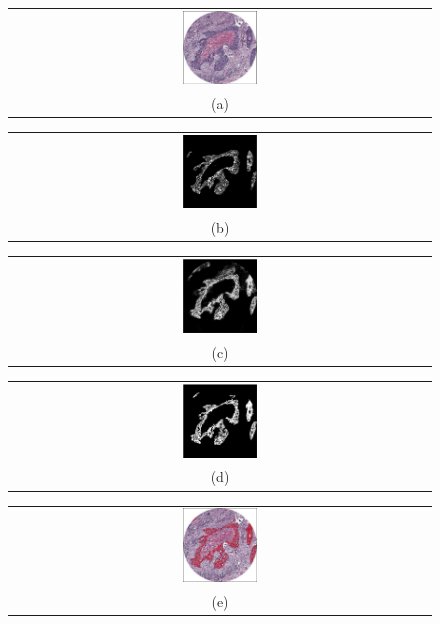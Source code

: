 \begin{figure}[h]
    \center
    
    \begin{tabular}{@{}c@{}}
        \includegraphics[width=0.18\textwidth]{figures/2_theoric_foundamentations/dali/input.png}
        \\[\abovecaptionskip]
    \small (a)
    \end{tabular}
    \begin{tabular}{@{}c@{}}
        \includegraphics[width=0.18\textwidth]{figures/2_theoric_foundamentations/dali/gold_standard.png}
        \\[\abovecaptionskip]
    \small (b)
    \end{tabular}
    \begin{tabular}{@{}c@{}}
        \includegraphics[width=0.18\textwidth]{figures/2_theoric_foundamentations/dali/probabilidades.png}
        \\[\abovecaptionskip]
    \small (c)
    \end{tabular}
    \begin{tabular}{@{}c@{}}
        \includegraphics[width=0.18\textwidth]{figures/2_theoric_foundamentations/dali/net_output.png}
        \\[\abovecaptionskip]
    \small (d)
    \end{tabular}
    \begin{tabular}{@{}c@{}}
        \includegraphics[width=0.18\textwidth]{figures/2_theoric_foundamentations/dali/final.png}
        \\[\abovecaptionskip]
    \small (e)
    \end{tabular}


\end{figure}
